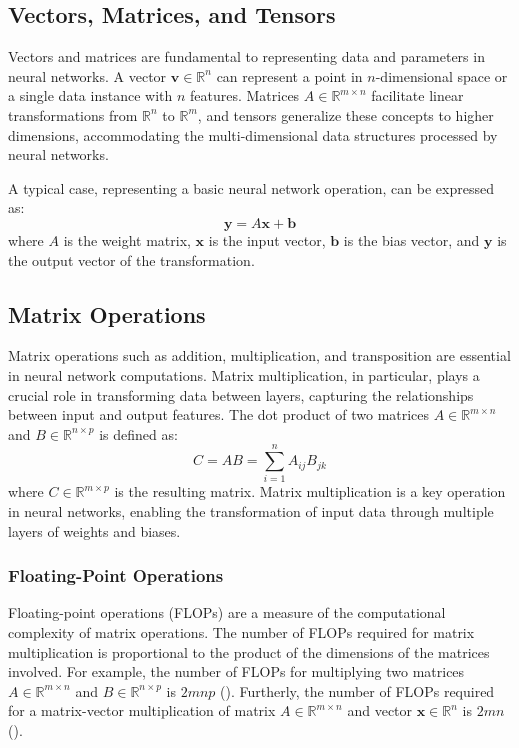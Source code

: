\subsection{Vectors, Matrices, and Tensors}
Vectors and matrices are fundamental to representing data and parameters in neural networks. A vector $\mathbf{v} \in \mathbb{R}^n$ can represent a point in $n$-dimensional space or a single data instance with $n$ features. Matrices $A \in \mathbb{R}^{m \times n}$ facilitate linear transformations from $\mathbb{R}^n$ to $\mathbb{R}^m$, and tensors generalize these concepts to higher dimensions, accommodating the multi-dimensional data structures processed by neural networks.

A typical case, representing a basic neural network operation, can be expressed as:
\begin{equation}
    \mathbf{y} = A\mathbf{x} + \mathbf{b}
    \label{eq:matrix_multiplication}
\end{equation}
where $A$ is the weight matrix, $\mathbf{x}$ is the input vector, $\mathbf{b}$ is the bias vector, and $\mathbf{y}$ is the output vector of the transformation.

\subsection{Matrix Operations}
    Matrix operations such as addition, multiplication, and transposition are essential in neural network computations. Matrix multiplication, in particular, plays a crucial role in transforming data between layers, capturing the relationships between input and output features. The dot product of two matrices $A \in \mathbb{R}^{m \times n}$ and $B \in \mathbb{R}^{n \times p}$ is defined as:
    \begin{equation}
        C = AB = \sum_{i=1}^{n} A_{ij}B_{jk}
        \label{eq:matrix_multiplication}
    \end{equation}
    where $C \in \mathbb{R}^{m \times p}$ is the resulting matrix. Matrix multiplication is a key operation in neural networks, enabling the transformation of input data through multiple layers of weights and biases.
    
    \subsubsection{Floating-Point Operations}
    Floating-point operations (FLOPs) are a measure of the computational complexity of matrix operations. The number of FLOPs required for matrix multiplication is proportional to the product of the dimensions of the matrices involved. For example, the number of FLOPs for multiplying two matrices $A \in \mathbb{R}^{m \times n}$ and $B \in \mathbb{R}^{n \times p}$ is $2mnp$ (\cite{swann2022numerisk}). Furtherly, the number of FLOPs required for a matrix-vector multiplication of matrix $A \in \mathbb{R}^{m \times n}$ and vector $\mathbf{x} \in \mathbb{R}^n$ is $2mn$ (\cite{swann2022numerisk}).

